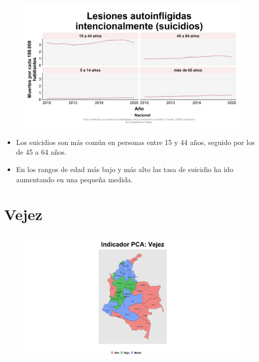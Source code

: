     \begin{figure}[H]
        \caption[Lesiones autoinfligidas intencionalmente (suicidios) por grupos de edad ]{\label{suicid_edad_trend} }
        \begin{center}
        \includegraphics[width=\textwidth,keepaspectratio]{img/var_295_trend.png}
        \end{center}
    \end{figure}
            \begin{itemize}
                \item Los suicidios son más común en personas entre 15 y 44 años, seguido por los de 45 a 64 años.
                \item En los rangos de edad más bajo y más alto las tasa de suicidio ha ido aumentando en una pequeña medida.
                \end{itemize}

\section{Vejez}

\begin{figure}[H]
        \caption[Indicador Pulso Social sobre Vejez]{\label{pca_pobreza} }
        \begin{center}
        \includegraphics[width=\textwidth,keepaspectratio]{pca_clusters/pca_vejez_pca.png}
        \end{center}
    \end{figure}
    
